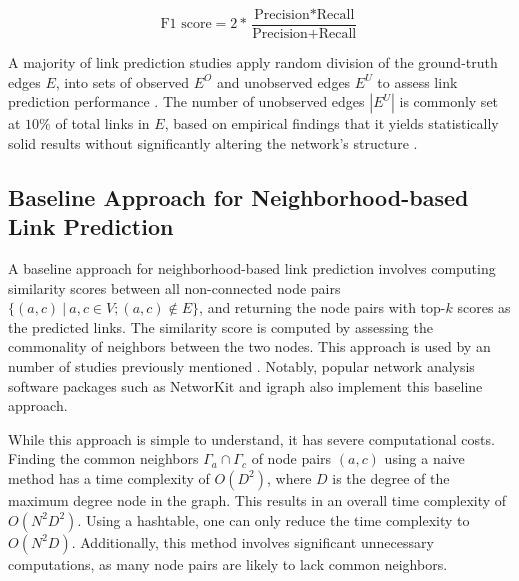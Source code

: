 \begin{equation}
\label{eq:f1score}
  \text{F1 score} = 2 * \frac{\text{Precision} * \text{Recall}}{\text{Precision} + \text{Recall}}
\end{equation}

A majority of link prediction studies apply random division of the ground-truth edges $E$, into sets of observed $E^O$ and unobserved edges $E^U$ to assess link prediction performance \cite{zhou2021progresses}. The number of unobserved edges $|E^U|$ is commonly set at $10\%$ of total links in $E$, based on empirical findings that it yields statistically solid results without significantly altering the network's structure \cite{lu2015toward}.




\subsection{Baseline Approach for Neighborhood-based Link Prediction}

A baseline approach for neighborhood-based link prediction involves computing similarity scores between all non-connected node pairs $\{(a, c)\ |\ a, c \in V; (a, c) \notin E\}$, and returning the node pairs with top-$k$ scores as the predicted links. The similarity score is computed by assessing the commonality of neighbors between the two nodes. This approach is used by an number of studies previously mentioned \cite{gatadi2023lpcd, saifi2023fast, benhidour2022approach, mumin2022efficient, rafiee2020cndp, guo2019node, yang2015new, papadimitriou2012fast, wang2019link}. Notably, popular network analysis software packages such as NetworKit \cite{staudt2016networkit} and igraph \cite{csardi2006igraph} also implement this baseline approach.

While this approach is simple to understand, it has severe computational costs. Finding the common neighbors $\Gamma_a \cap \Gamma_c$ of node pairs $(a, c)$ using a naive method has a time complexity of $O(D^2)$, where $D$ is the degree of the maximum degree node in the graph. This results in an overall time complexity of $O(N^2D^2)$. Using a hashtable, one can only reduce the time complexity to $O(N^2D)$. Additionally, this method involves significant unnecessary computations, as many node pairs are likely to lack common neighbors.
